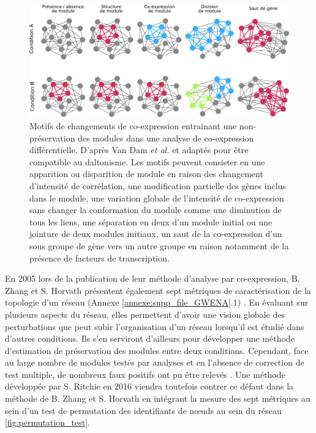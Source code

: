 \begin{figure}
    \centering
    \includegraphics[width=\textwidth]{img/intro/3_coexpr/intro_3_coexpr_codiff.pdf}
    \caption[Motifs de changements de co-expression entrainant une non-préservation des modules dans une analyse de co-expression différentielle]{Motifs de changements de co-expression entrainant une non-préservation des modules dans une analyse de co-expression différentielle. D'après Van Dam \textit{et al.} \cite{VanDam2018} et adaptés pour être compatible au daltonisme. Les motifs peuvent consister en une apparition ou disparition de module en raison des changement d'intensité de corrélation, une modification partielle des gènes inclus dans le module, une variation globale de l'intensité de co-expression sans changer la conformation du module comme une diminution de tous les liens, une séparation en deux d'un module initial ou une jointure de deux modules initiaux, un saut de la co-expression d'un sous groupe de gène vers un autre groupe en raison notamment de la présence de facteurs de transcription.}
    \label{fig:differential_coexpression_patterns}
\end{figure}



En 2005 lors de la publication de leur méthode d'analyse par co-expression, B. Zhang et S. Horvath présentent également sept métriques de caractérisation de la topologie d'un réseau (Annexe \ref{annexe:supp_file_GWENA}.1) \cite{Zhang2005a}. En évaluant sur plusieurs aspects du réseau, elles permettent d'avoir une vision globale des perturbations que peut subir l'organisation d'un réseau lorsqu'il est étudié dans d'autres conditions. Ils s'en serviront d'ailleurs pour développer une méthode d'estimation de préservation des modules entre deux conditions. Cependant, face au large nombre de modules testés par analyses et en l'absence de correction de test multiple, de nombreux faux positifs ont pu être relevés \cite{Ritchie2016}. Une méthode développée par S. Ritchie en 2016 viendra toutefois contrer ce défaut dans la méthode de B. Zhang et S. Horvath en intégrant la mesure des sept métriques au sein d'un test de permutation des identifiants de nœuds au sein du réseau \ref{fig:permutation_test}. 

